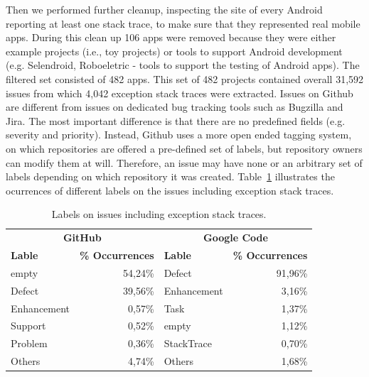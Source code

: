 \documentclass[conference]{IEEEtran}
\begin{document}
Then we performed further cleanup, inspecting the site of every Android
reporting at least one stack trace, to make sure that they represented real
mobile apps. During this clean up 106 apps were removed because they were either
example projects (i.e., toy projects) or tools to support Android development
(e.g. Selendroid, Roboeletric - tools to support the testing of Android apps).
The filtered set consisted of 482 apps. This set of 482 projects contained overall 31,592 issues from which 4,042 exception stack traces 
were extracted. Issues on Github are different from issues on dedicated bug tracking tools such as 
Bugzilla and Jira. The most important difference is that there are no predefined fields
  (e.g. severity and priority). Instead, Github uses a more open ended tagging system, on which
repositories are offered a pre-defined set of labels, but repository owners can modify 
them at will. Therefore, an issue may have none or an arbitrary set of labels depending 
on which repository it was created. Table~\ref{tab:lables} illustrates the ocurrences of different labels 
on the issues including exception stack traces.



\begin{table}
  \centering
  \begin{tabular}{lr|lr}
    \hline
     \multicolumn{2}{c}{\bfseries{GitHub}} &  \multicolumn{2}{c}{\bfseries{Google Code}} \\
      \bfseries{Lable} &  \bfseries{\% Occurrences} &  \bfseries{Lable} &  \bfseries{\% Occurrences} \\
    \hline
empty &	54,24\% & Defect &	91,96\% \\
Defect &	39,56\%  & Enhancement  &	3,16\% \\
Enhancement &	0,57\% & Task	& 1,37\% \\
Support &	0,52\% & empty &	1,12\% \\
Problem &	0,36\% & StackTrace &	0,70\% \\
Others &	4,74\% &  Others &	1,68\% \\   
  \hline
  \end{tabular}
  \caption{Labels on issues including exception stack traces.}
  \label{tab:lables}
\end{table}
\end{document}
